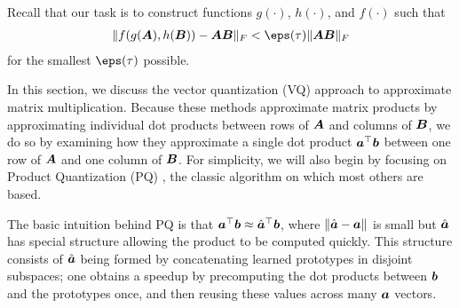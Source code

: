 



Recall that our task is to construct functions $g(\cdot)$, $h(\cdot)$, and $f(\cdot)$ such that
\begin{align}
    \norm{f(g(\A), h(\B)) - \A\B}_F < \eps(\tau) \norm{\A\B}_F
\end{align}
for the smallest $\eps(\tau)$ possible.

In this section, we discuss the vector quantization (VQ) approach to approximate matrix multiplication. Because these methods approximate matrix products by approximating individual dot products between rows of $\bm{A}$ and columns of $\bm{B}$, we do so by examining how they approximate a single dot product $\bm{a}^\top \bm{b}$ between one row of $\bm{A}$ and one column of $\bm{B}$. For simplicity, we will also begin by focusing on Product Quantization (PQ) \cite{pq}, the classic algorithm on which most others are based.

The basic intuition behind PQ is that $\bm{a}^\top \bm{b} \approx \hat{\bm{a}}^\top \bm{b}$, where $\lVert\hat{\bm{a}} - \bm{a}\rVert$ is small but $\hat{\bm{a}}$ has special structure allowing the product to be computed quickly. This structure consists of $\hat{\bm{a}}$ being formed by concatenating learned prototypes in disjoint subspaces; one obtains a speedup by precomputing the dot products between $\bm{b}$ and the prototypes once, and then reusing these values across many $\bm{a}$ vectors.


